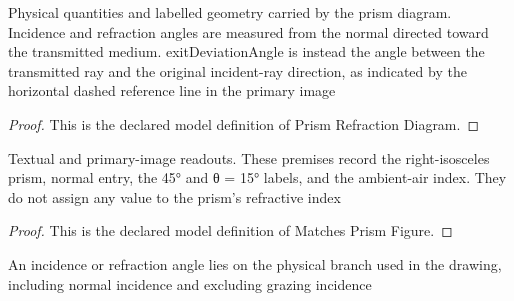\begin{definition}
  \label{def:physics:phyx-mini-0006:phyxminiproblems-problemphyxmini0006-prismrefractiondiagram}
  Physical quantities and labelled geometry carried by the prism diagram. Incidence and refraction angles are measured from the normal directed toward the transmitted medium. exitDeviationAngle is instead the angle between the transmitted ray and the original incident-ray direction, as indicated by the horizontal dashed reference line in the primary image
\end{definition}
\begin{proof}
  This is the declared model definition of Prism Refraction Diagram.
\end{proof}
\begin{definition}
  \label{def:physics:phyx-mini-0006:phyxminiproblems-problemphyxmini0006-matchesprismfigure}
  Textual and primary-image readouts. These premises record the right-isosceles prism, normal entry, the 45° and θ = 15° labels, and the ambient-air index. They do not assign any value to the prism's refractive index
\end{definition}
\begin{proof}
  This is the declared model definition of Matches Prism Figure.
\end{proof}
\begin{definition}
  \label{def:physics:phyx-mini-0006:phyxminiproblems-problemphyxmini0006-isphysicalrayangle}
  An incidence or refraction angle lies on the physical branch used in the drawing, including normal incidence and excluding grazing incidence
\end{definition}
